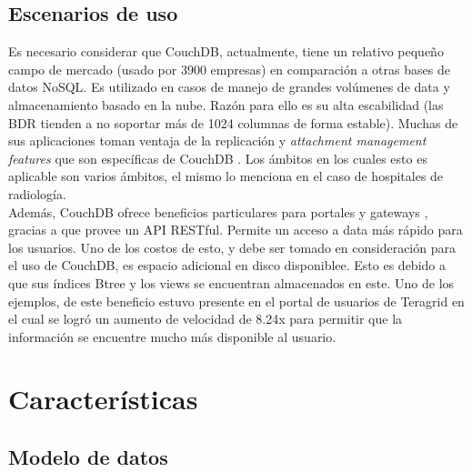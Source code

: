 \documentclass{article}
\begin{document}
        \subsection{Escenarios de uso}
            Es necesario considerar que CouchDB, actualmente, tiene un relativo pequeño campo de mercado (usado por 3900 empresas) en comparación a otras bases de datos NoSQL. Es utilizado en casos de manejo de grandes volúmenes de data y almacenamiento basado en la nube. Razón para ello es su alta escabilidad (las BDR tienden a no soportar más de 1024 columnas de forma estable). Muchas de sus aplicaciones toman ventaja de la replicación y \textit{attachment management features} que son específicas de CouchDB \cite{rascovsky}. Los ámbitos en los cuales esto es aplicable son varios ámbitos, el mismo \cite{rascovsky} lo menciona en el caso de hospitales de radiología.\\
            Además, CouchDB ofrece beneficios particulares para portales y gateways \cite{hanlon}, gracias a que provee un API RESTful. Permite un acceso a data más rápido para los usuarios. Uno de los costos de esto, y debe ser tomado en consideración para el uso de CouchDB, es espacio adicional en disco disponiblee. Esto es debido a que sus índices Btree y los views se encuentran almacenados en este. Uno de los ejemplos, de este beneficio estuvo presente en el portal de usuarios de Teragrid en el cual se logró un aumento de velocidad de 8.24x \cite{hanlon} para permitir que la información se encuentre mucho más disponible al usuario.
    \section{Características}
        \subsection{Modelo de datos}
\end{document}
